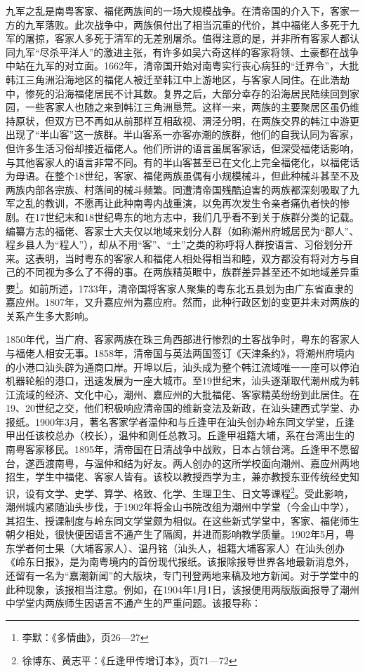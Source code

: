 九军之乱是南粤客家、福佬两族间的一场大规模战争。在清帝国的介入下，客家一方的九军落败。此次战争中，两族俱付出了相当沉重的代价，其中福佬人多死于九军的屠掠，客家人多死于清军的无差别屠杀。值得注意的是，并非所有客家人都认同九军“尽杀平洋人”的激进主张，有许多如吴六奇这样的客家将领、土豪都在战争中站在九军的对立面。1662年，清帝国开始对南粤实行丧心病狂的“迁界令”，大批韩江三角洲沿海地区的福佬人被迁至韩江中上游地区，与客家人同住。在此浩劫中，惨死的沿海福佬居民不计其数。复界之后，大部分幸存的沿海居民陆续回到家园，一些客家人也随之来到韩江三角洲垦荒。这样一来，两族的主要聚居区虽仍维持原状，但双方已不再如从前那样互相敌视、渭泾分明，在两族交界的韩江中游更出现了“半山客”这一族群。半山客系一亦客亦潮的族群，他们的自我认同为客家，但许多生活习俗却接近福佬人。他们所讲的语言虽属客家话，但深受福佬话影响，与其他客家人的语言非常不同。有的半山客甚至已在文化上完全福佬化，以福佬话为母语。在整个18世纪，客家、福佬两族虽偶有小规模械斗，但此种械斗甚至不及两族内部各宗族、村落间的械斗频繁。同遭清帝国残酷迫害的两族都深刻吸取了九军之乱的教训，不愿再让此种南粤内战重演，以免再次发生令亲者痛仇者快的惨剧。在17世纪末和18世纪粤东的地方志中，我们几乎看不到关于族群分类的记载。编纂方志的福佬、客家士大夫仅以地域来划分人群（如称潮州府城居民为“郡人”、程乡县人为“程人”），却从不用“客”、“土”之类的称呼将人群按语言、习俗划分开来。这表明，当时粤东的客家人和福佬人相处得相当和睦，双方都没有将对方与自己的不同视为多么了不得的事。在两族精英眼中，族群差异甚至还不如地域差异重要\footnote{李默：《多情曲》，页26—27}。如前所述，1733年，清帝国将客家人聚集的粤东北五县划为由广东省直隶的嘉应州。1807年，又升嘉应州为嘉应府。然而，此种行政区划的变更并未对两族的关系产生多大影响。

1850年代，当广府、客家两族在珠三角西部进行惨烈的土客战争时，粤东的客家人与福佬人相安无事。1858年，清帝国与英法两国签订《天津条约》，将潮州府境内的小港口汕头辟为通商口岸。开埠以后，汕头成为整个韩江流域唯一一座可以停泊机器轮船的港口，迅速发展为一座大城市。至19世纪末，汕头逐渐取代潮州成为韩江流域的经济、文化中心，潮州、嘉应州的大批福佬、客家精英纷纷到此居住。在19、20世纪之交，他们积极响应清帝国的维新变法及新政，在汕头建西式学堂、办报纸。1900年3月，著名客家学者温仲和与丘逢甲在汕头创办岭东同文学堂，丘逢甲出任该校总办（校长），温仲和则任总教习。丘逢甲祖籍大埔，系在台湾出生的南粤客家移民。1895年，清帝国在日清战争中战败，日本占领台湾。丘逢甲不愿留台，遂西渡南粤，与温仲和结为好友。两人创办的这所学校面向潮州、嘉应州两地招生，学生中福佬、客家人皆有。该校以教授西学为主，兼亦教授东亚传统经史知识，设有文学、史学、算学、格致、化学、生理卫生、日文等课程\footnote{徐博东、黄志平：《丘逢甲传增订本》，页71—72}。受此影响，潮州城内紧随汕头步伐，于1902年将金山书院改组为潮州中学堂（今金山中学），其招生、授课制度与岭东同文学堂颇为相似。在这些新式学堂中，客家、福佬师生朝夕相处，很快便因语言不通产生了隔阂，并进而影响教学质量。1902年5月，粤东学者何士果（大埔客家人）、温丹铭（汕头人，祖籍大埔客家人）在汕头创办《岭东日报》，是为南粤境内的首份现代报纸。该报除报导世界各地最新消息外，还留有一名为“嘉潮新闻”的大版块，专门刊登两地来稿及地方新闻。对于学堂中的此种现象，该报相当注意。例如，在1904年1月1日，该报便用两版版面报导了潮州中学堂内两族师生因语言不通产生的严重问题。该报导称：

